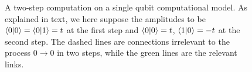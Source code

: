 \begin{figure}
    \centering
    
    \caption{A two-step computation on a single qubit computational model. As explained in text, we here suppose the amplitudes to be $\braket{0}{0} = \braket{0}{1} = t$ at the first step and $\braket{0}{0} = t$, $\braket{1}{0} = - t$ at the second step. The dashed lines are connections irrelevant to the process $0\to 0$ in two steps, while the green lines are the relevant links.}
    \label{fig:two states quantum model}
\end{figure}

